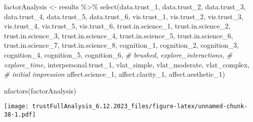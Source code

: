 \documentclass[
]{article}
\newenvironment{Shaded}{\begin{snugshade}}{\end{snugshade}}
\newcommand{\CommentTok}[1]{\textcolor[rgb]{0.56,0.35,0.01}{\textit{#1}}}
\newcommand{\FunctionTok}[1]{\textcolor[rgb]{0.00,0.00,0.00}{#1}}
\newcommand{\NormalTok}[1]{#1}
\newcommand{\OtherTok}[1]{\textcolor[rgb]{0.56,0.35,0.01}{#1}}
\newcommand{\SpecialCharTok}[1]{\textcolor[rgb]{0.00,0.00,0.00}{#1}}
\begin{document}
\begin{Shaded}
\begin{Highlighting}[]
\NormalTok{factorAnalysis }\OtherTok{\textless{}{-}}\NormalTok{ results }\SpecialCharTok{\%\textgreater{}\%}
  \FunctionTok{select}\NormalTok{(data.trust\_1, data.trust\_2, data.trust\_3, data.trust\_4, data.trust\_5, data.trust\_6,}
\NormalTok{         vis.trust\_1, vis.trust\_2, vis.trust\_3, vis.trust\_4, vis.trust\_5, vis.trust\_6,}
\NormalTok{         trust.in.science\_1, trust.in.science\_2, trust.in.science\_3, trust.in.science\_4, trust.in.science\_5,}
\NormalTok{         trust.in.science\_6, trust.in.science\_7, trust.in.science\_8, }
\NormalTok{         cognition\_1, cognition\_2, cognition\_3, cognition\_4, cognition\_5, cognition\_6,}
         \CommentTok{\# brushed, explore\_interactions, \# explore\_time, }
\NormalTok{         interpersonal.trust\_1,}
\NormalTok{         vlat\_simple, vlat\_moderate, vlat\_complex,}
         \CommentTok{\# initial impression}
\NormalTok{         affect.science\_1, affect.clarity\_1, affect.aesthetic\_1)}

\FunctionTok{nfactors}\NormalTok{(factorAnalysis)}
\end{Highlighting}
\end{Shaded}

\texttt{[image: trustFullAnalysis\_6.12.2023\_files/figure-latex/unnamed-chunk-38-1.pdf]}
\end{document}
